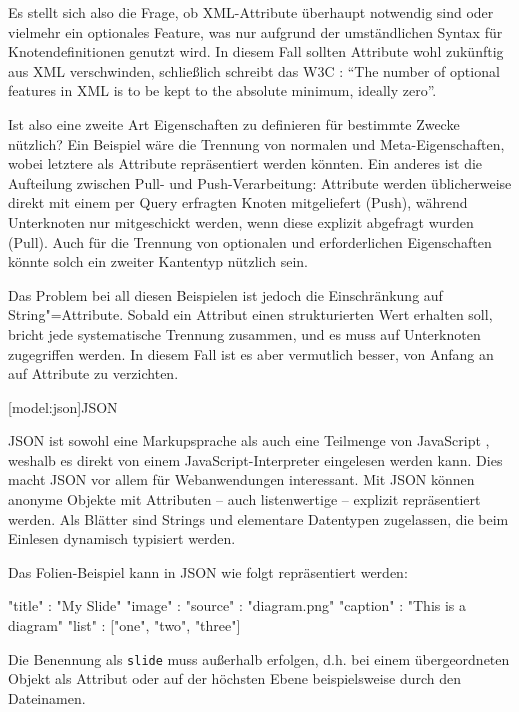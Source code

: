 \documentclass[12pt, a4paper, bibgerm]{scrbook}
\newenvironment{DIFnomarkup}{}{}
\newcommand\icode[1]{\lstinline?#1?}
\newcommand\lsection{}
\begin{document}
Es stellt sich also die Frage, ob XML-Attribute überhaupt notwendig sind
oder vielmehr ein optionales Feature, was nur aufgrund der umständlichen
Syntax für Knotendefinitionen genutzt wird. In diesem Fall
sollten Attribute wohl zukünftig aus XML verschwinden, schließlich
schreibt das W3C \cite{XmlSpec}: "`The number of optional features in XML
is to be kept to the absolute minimum, ideally zero"'.

Ist also eine zweite Art Eigenschaften zu definieren für
bestimmte Zwecke nützlich? Ein Beispiel wäre die Trennung von normalen
und Meta-Eigenschaften, wobei letztere als Attribute repräsentiert
werden könnten. Ein anderes ist die Aufteilung zwischen Pull- und
Push-Verarbeitung: Attribute werden üblicherweise direkt mit einem per
Query erfragten Knoten mitgeliefert (Push), während Unterknoten nur
mitgeschickt werden, wenn diese explizit abgefragt wurden (Pull). Auch
für die Trennung von optionalen und erforderlichen Eigenschaften könnte
solch ein zweiter Kantentyp nützlich sein.

Das Problem bei all diesen Beispielen ist jedoch die Einschränkung auf
String"=Attribute. Sobald ein Attribut einen strukturierten Wert erhalten
soll, bricht jede systematische Trennung zusammen, und es muss auf
Unterknoten zugegriffen werden. In diesem Fall ist es aber vermutlich
besser, von Anfang an auf Attribute zu verzichten.

\lsection[model:json]{JSON}

JSON ist sowohl eine Markupsprache als auch eine Teilmenge von
JavaScript \cite{JavaScript}, weshalb es direkt von einem
JavaScript-Interpreter eingelesen werden kann. Dies macht JSON vor allem
für Webanwendungen interessant. Mit JSON können anonyme Objekte mit
Attributen -- auch listenwertige -- explizit repräsentiert werden. Als
Blätter sind Strings und elementare Datentypen zugelassen, die beim
Einlesen dynamisch typisiert werden.

Das Folien-Beispiel kann in JSON wie folgt repräsentiert werden:
\begin{DIFnomarkup}\begin{code}
{
  "title" : "My Slide"
  "image" : {
    "source"  : "diagram.png"
    "caption" : "This is a diagram"
  }
  "list"  : ["one", "two", "three"]
}
\end{code}\end{DIFnomarkup}
Die Benennung als \icode{slide} muss außerhalb erfolgen, d.h. bei einem
übergeordneten Objekt als Attribut oder auf der höchsten Ebene
beispielsweise durch den Dateinamen.
\end{document}
